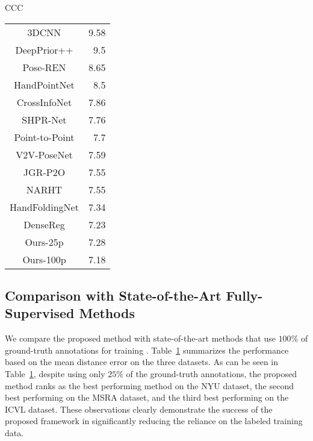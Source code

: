 \documentclass{article}
\begin{document}
\begin{table}[!h]
\begin{tabularx}{\columnwidth}{CCC}
{\begin{tabular}{cr}
             3DCNN \cite{ge20173d}             &         9.58 \\
  DeepPrior++ \cite{oberweger2017deepprior++}  &         9.5  \\
         Pose-REN \cite{chen2020pose}          &         8.65 \\
        HandPointNet \cite{ge2018hand}         &         8.5  \\
    CrossInfoNet \cite{du2019crossinfonet}     &         7.86 \\
         SHPR-Net \cite{chen2018shpr}          &         7.76 \\
       Point-to-Point \cite{ge2018point}       &         7.7  \\
        V2V-PoseNet \cite{moon2018v2v}         &         7.59 \\
          JGR-P2O \cite{fang2020jgr}           &         7.55 \\
          NARHT \cite{huang2020hand}           &         7.55 \\
 HandFoldingNet \cite{cheng2021handfoldingnet} &         7.34 \\
         DenseReg \cite{wan2018dense}          &         7.23 \\
Ours-25p                                      &          7.28 \\
 Ours-100p                                     &        7.18 \\
\hline
\end{tabular}
}

\end{tabularx}
\label{tab:comprehensive}
\end{table}
\subsection{Comparison with State-of-the-Art Fully-Supervised Methods}
We compare the proposed method with state-of-the-art methods that use $100\%$ of ground-truth annotations for training \cite{zhou2016model,oberweger2015hands,oberweger2017deepprior++,guo2017region,wang2018region,chen2020pose,oberweger2019generalized,wan2018dense,xiong2019a2j,du2019crossinfonet,fang2020jgr,ge20173d,chen2018shpr,ge2018hand,ge2018point,huang2020hand,cheng2021handfoldingnet,moon2018v2v}.
 Table~\ref{tab:comprehensive} summarizes the performance based on the mean distance error on the three datasets. As can be seen in Table~\ref{tab:comprehensive}, despite using only $25\%$ of the ground-truth annotations, the proposed method ranks as the best performing method on the NYU dataset, the second best performing on the MSRA dataset, and the third best performing on the ICVL dataset. These observations clearly demonstrate the success of the proposed framework in significantly reducing the reliance on the labeled training data. 
\end{document}
